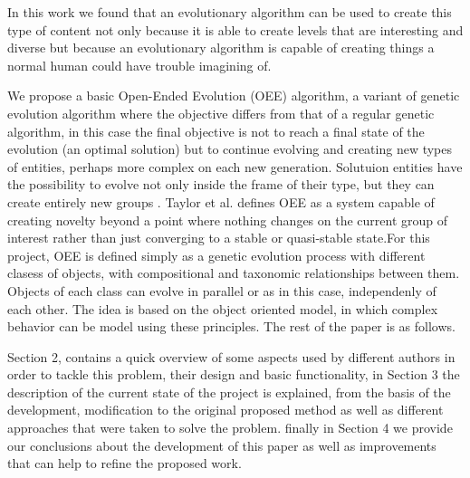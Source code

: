\documentclass[conference]{IEEEtran}
\begin{document}
    In this work we found that an evolutionary algorithm can be used to create 
    this type of content not only because it is able to create levels that are interesting 
    and diverse but because an evolutionary algorithm is capable of creating things a 
    normal human could have trouble imagining of.
    
    
    
    We propose a basic Open-Ended Evolution (OEE) algorithm, a variant of genetic
    evolution algorithm where the objective differs from that of a regular genetic
    algorithm,  in this case the final objective is not to reach a final state of
    the evolution (an optimal solution) but to continue evolving and creating new
    types of entities, perhaps more complex on each new generation. Solutuion
    entities have the possibility to evolve not only inside the frame of their type,
    but  they can create entirely new groups \cite{Standish2003}. Taylor et al.
    \cite{Taylor2016,Taylor} defines OEE as a system capable of creating novelty
    beyond a point where nothing changes on the current group of interest rather
    than just converging to a stable or quasi-stable state.For this project, OEE is
    defined simply as a genetic evolution process with different clasess of objects,
    with compositional and taxonomic relationships between them. Objects of each
    class can evolve in parallel or as in this case, independenly of each other. The
    idea is based on the object oriented model, in which complex behavior can be
    model using these principles. The rest of the paper is as follows.
    
    
    Section 2, contains a quick overview of some aspects used by different authors
    in order to tackle this problem, their design and basic functionality, in
    Section 3 the description of the current state of the project is explained, from
    the basis of the development, modification to the original proposed method as 
    well as different approaches that were taken to solve the problem.
    finally in Section 4 we provide our conclusions about the development of this
    paper as well as improvements that can help to refine the proposed work. 
    
\end{document}

